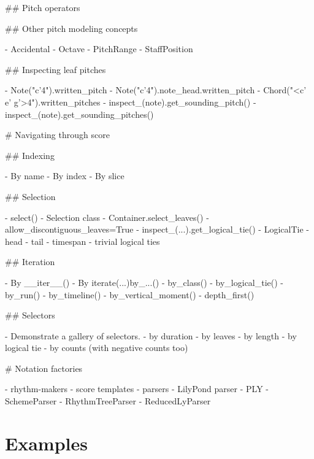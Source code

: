 \begin{markdown}
## Pitch operators

## Other pitch modeling concepts

-   Accidental
-   Octave
-   PitchRange
-   StaffPosition

## Inspecting leaf pitches

-   Note("c'4").written_pitch
-   Note("c'4").note_head.written_pitch
-   Chord("<c' e' g'>4").written_pitches
-   inspect_(note).get_sounding_pitch()
-   inspect_(note).get_sounding_pitches()

# Navigating through score

## Indexing

-   By name
-   By index
-   By slice

## Selection

-   select()
-   Selection class
-   Container.select_leaves()
    -   allow_discontiguous_leaves=True
-   inspect_(...).get_logical_tie()
-   LogicalTie
    -   head
    -   tail
    -   timespan
    -   trivial logical ties

## Iteration

-   By __iter__()
-   By iterate(...)by_...()
    -   by_class()
    -   by_logical_tie()
    -   by_run()
    -   by_timeline()
    -   by_vertical_moment()
    -   depth_first()

## Selectors

-   Demonstrate a gallery of selectors.
    -   by duration
    -   by leaves
    -   by length
    -   by logical tie
    -   by counts (with negative counts too)

# Notation factories

-   rhythm-makers
-   score templates
-   parsers
    -   LilyPond parser
    -   PLY
    -   SchemeParser
    -   RhythmTreeParser
    -   ReducedLyParser

\end{markdown}

\section{Examples}

\begin{comment}
<abjad>
upper_voice = Voice(name='Upper Voice')
upper_staff = Staff([upper_voice], name='Upper Staff')
lower_voice_a = Voice(name='Lower Voice A')
lower_voice_b = Voice(name='Lower Voice B')
lower_staff = Staff([lower_voice_a, lower_voice_b], name='Lower Staff')
piano_staff = StaffGroup([upper_staff, lower_staff], context_name='PianoStaff')
</abjad>
\end{comment}


